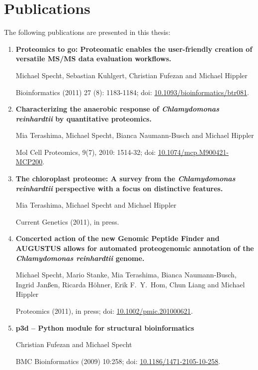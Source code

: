 \cleardoublepage
\chapter{Publications}

The following publications are presented in this thesis:

\begin{enumerate}
\item 
{\bf Proteomics to go: Proteomatic enables the user-friendly creation of versatile MS/MS data evaluation workflows.}

Michael Specht, Sebastian Kuhlgert, Christian Fufezan and Michael Hippler

Bioinformatics (2011) 27 (8): 1183-1184; doi: \href{http://dx.doi.org/10.1093/bioinformatics/btr081}{10.1093/bioinformatics/btr081}.

\item
{\bf Characterizing the anaerobic response of {\em Chlamydomonas reinhardtii} by quantitative proteomics.}

Mia Terashima, Michael Specht, Bianca Naumann-Busch and Michael Hippler

Mol Cell Proteomics, 9(7), 2010: 1514-32; doi: \href{http://dx.doi.org/10.1074/mcp.M900421-MCP200}{10.1074/mcp.M900421-MCP200}.

\item
{\bf The chloroplast proteome: A survey from the {\em Chlamydomonas reinhardtii} perspective with a focus on distinctive features.}

Mia Terashima, Michael Specht and Michael Hippler

Current Genetics (2011), in press.

\item
{\bf Concerted action of the new Genomic Peptide Finder and AUGUSTUS allows for automated proteogenomic annotation of the {\em Chlamydomonas reinhardtii} genome.}

Michael Specht, Mario Stanke, Mia Terashima, Bianca Naumann-Busch, Ingrid Janßen, Ricarda H\"ohner, Erik F.~Y.~Hom, Chun Liang and Michael Hippler

Proteomics (2011), in press; doi: \href{http://dx.doi.org/10.1002/pmic.201000621}{10.1002/pmic.201000621}.

% 
\item
{\bf p3d -- Python module for structural bioinformatics}

Christian Fufezan and Michael Specht

BMC Bioinformatics (2009) 10:258; doi: \href{http://dx.doi.org/10.1186/1471-2105-10-258}{10.1186/1471-2105-10-258}.

\end{enumerate}

